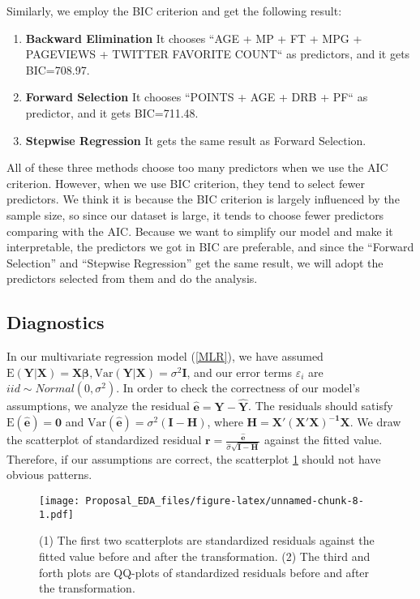 \documentclass[12pt,]{article}
\begin{document}
Similarly, we employ the BIC criterion and get the following result:

\begin{enumerate}
\item \textbf{Backward Elimination} It chooses ``AGE + MP + FT + MPG + PAGEVIEWS + TWITTER FAVORITE COUNT`` as predictors, and it gets BIC=708.97.
\item \textbf{Forward Selection} It chooses ``POINTS + AGE + DRB + PF`` as predictor, and it gets BIC=711.48.
\item \textbf{Stepwise Regression} It gets the same result as Forward Selection.
\end{enumerate}

All of these three methods choose too many predictors when we use the
AIC criterion. However, when we use BIC criterion, they tend to select
fewer predictors. We think it is because the BIC criterion is largely
influenced by the sample size, so since our dataset is large, it tends
to choose fewer predictors comparing with the AIC. Because we want to
simplify our model and make it interpretable, the predictors we got in
BIC are preferable, and since the ``Forward Selection'' and ``Stepwise
Regression'' get the same result, we will adopt the predictors selected
from them and do the analysis.

\subsection{Diagnostics}

In our multivariate regression model (\ref{MLR}), we have assumed
\(\text{E}(\mathbf{Y}|\mathbf{X})=\mathbf{X\beta}, \text{Var}(\mathbf{Y}|\mathbf{X})=\sigma^2\mathbf{I}\),
and our error terms \(\varepsilon_i\) are
\(iid \sim Normal(0,\sigma^2)\). In order to check the correctness of
our model's assumptions, we analyze the residual
\(\hat{\mathbf{e}} =\mathbf{Y}-\mathbf{\hat{Y}}\). The residuals should
satisfy \(\text{E}(\hat{\mathbf{e}})=\mathbf{0}\) and
\(\text{Var}(\hat{\mathbf{e}})= \sigma^2(\mathbf{I}-\mathbf{H})\), where
\(\mathbf{H}=\mathbf{X'(X'X)^{-1}X}\). We draw the scatterplot of
standardized residual
\(\mathbf{r}=\frac{\mathbf{\hat{e}}}{\hat{\sigma}\sqrt{\mathbf{I-H}}}\)
against the fitted value. Therefore, if our assumptions are correct, the
scatterplot \ref{fig:residual} should not have obvious patterns.

\begin{figure}
\centering
\texttt{[image: Proposal\_EDA\_files/figure-latex/unnamed-chunk-8-1.pdf]}
\caption{\label{fig:residual}(1) The first two scatterplots are
standardized residuals against the fitted value before and after the
transformation. (2) The third and forth plots are QQ-plots of
standardized residuals before and after the transformation.}
\end{figure}
\end{document}
